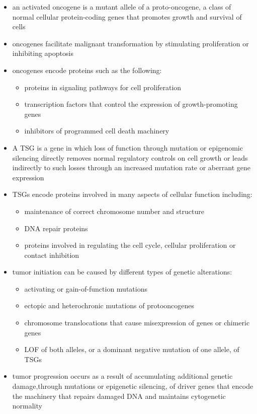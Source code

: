 \documentclass[12pt]{scrartcl}
\begin{document}
\begin{itemize}
\item an activated oncogene is a mutant allele of a proto-oncogene, a
class of normal cellular protein-coding genes that promotes growth
and survival of cells
\item oncogenes facilitate malignant transformation by stimulating
proliferation or inhibiting apoptosis
\item oncogenes encode proteins such as the following:
\begin{itemize}
\item proteins in signaling pathways for cell proliferation
\item transcription factors that control the expression of growth-promoting genes
\item inhibitors of programmed cell death machinery
\end{itemize}
\item A TSG is a gene in which loss of function through mutation or
epigenomic silencing directly removes normal regulatory controls on
cell growth or leads indirectly to such losses through an increased
mutation rate or aberrant gene expression
\item TSGs encode proteins involved in many aspects of cellular function including:
\begin{itemize}
\item maintenance of correct chromosome number and structure
\item DNA repair proteins
\item proteins involved in regulating the cell cycle, cellular
proliferation or contact inhibition
\end{itemize}

\item tumor initiation can be caused by different types of genetic
alterations:
\begin{itemize}
\item activating or gain-of-function mutations
\item ectopic and heterochronic mutations of protooncogenes
\item chromosome translocations that cause misexpression of genes or chimeric genes
\item LOF of both alleles, or a dominant negative mutation of one allele, of TSGs
\end{itemize}

\item tumor progression occurs as a result of accumulating additional
genetic damage,through mutations or epigenetic silencing, of driver
genes that encode the machinery that repairs damaged DNA and
maintains cytogenetic normality
\end{itemize}
\end{document}
